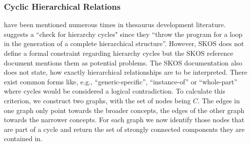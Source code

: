 \subsubsection{Cyclic Hierarchical Relations} have been mentioned numerous times in thesaurus development literature. \cite{Soergel2002} suggests a ``check for hierarchy cycles" since they ``throw the program for a loop in the generation of a complete hierarchical structure''. However, SKOS does not define a formal constraint regarding hierarchy cycles but the SKOS reference document mentions them as potential problems. The SKOS documentation also does not state, how exactly hierarchical relationships are to be interpreted. There exist common forms like, e.g., ``generic-specific'', ``instance-of'' or ``whole-part'' \cite{Hedden2010,Harpring2010,Aitchison2000} where cycles would be considered a logical contradiction. To calculate this criterion, we construct two graphs, with the set of nodes being $C$. The edges in one graph only point towards the broader concepts, the edges of the other graph towards the narrower concepts. For each graph we now identify those nodes that are part of a cycle and return the set of strongly connected components they are contained in.

 


